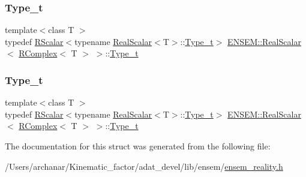 \subsubsection{\texorpdfstring{Type\_t}{Type\_t}\hspace{0.1cm}{\footnotesize\ttfamily [1/2]}}
{\footnotesize\ttfamily template$<$class T $>$ \\
typedef \mbox{\hyperlink{classENSEM_1_1RScalar}{R\+Scalar}}$<$typename \mbox{\hyperlink{structENSEM_1_1RealScalar}{Real\+Scalar}}$<$T$>$\+::\mbox{\hyperlink{structENSEM_1_1RealScalar_3_01RComplex_3_01T_01_4_01_4_a8e52d83700f12173749eb640b815684c}{Type\+\_\+t}}$>$ \mbox{\hyperlink{structENSEM_1_1RealScalar}{E\+N\+S\+E\+M\+::\+Real\+Scalar}}$<$ \mbox{\hyperlink{classENSEM_1_1RComplex}{R\+Complex}}$<$ T $>$ $>$\+::\mbox{\hyperlink{structENSEM_1_1RealScalar_3_01RComplex_3_01T_01_4_01_4_a8e52d83700f12173749eb640b815684c}{Type\+\_\+t}}}

\mbox{\label{structENSEM_1_1RealScalar_3_01RComplex_3_01T_01_4_01_4_a8e52d83700f12173749eb640b815684c}} 
\subsubsection{\texorpdfstring{Type\_t}{Type\_t}\hspace{0.1cm}{\footnotesize\ttfamily [2/2]}}
{\footnotesize\ttfamily template$<$class T $>$ \\
typedef \mbox{\hyperlink{classENSEM_1_1RScalar}{R\+Scalar}}$<$typename \mbox{\hyperlink{structENSEM_1_1RealScalar}{Real\+Scalar}}$<$T$>$\+::\mbox{\hyperlink{structENSEM_1_1RealScalar_3_01RComplex_3_01T_01_4_01_4_a8e52d83700f12173749eb640b815684c}{Type\+\_\+t}}$>$ \mbox{\hyperlink{structENSEM_1_1RealScalar}{E\+N\+S\+E\+M\+::\+Real\+Scalar}}$<$ \mbox{\hyperlink{classENSEM_1_1RComplex}{R\+Complex}}$<$ T $>$ $>$\+::\mbox{\hyperlink{structENSEM_1_1RealScalar_3_01RComplex_3_01T_01_4_01_4_a8e52d83700f12173749eb640b815684c}{Type\+\_\+t}}}



The documentation for this struct was generated from the following file\+:\begin{DoxyCompactItemize}
\item 
/\+Users/archanar/\+Kinematic\+\_\+factor/adat\+\_\+devel/lib/ensem/\mbox{\hyperlink{lib_2ensem_2ensem__reality_8h}{ensem\+\_\+reality.\+h}}\end{DoxyCompactItemize}
